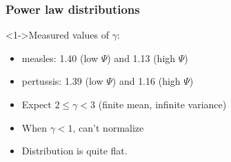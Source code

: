 \begin{frame}
  \frametitle{Power law distributions}

  \begin{block}<1->{Measured values of $\gamma$:}
    \begin{itemize}
    \item <2->{measles: \alert{1.40} (low $\Psi$) and \alert{1.13} (high $\Psi$)}
    \item <3->{pertussis: \alert{1.39} (low $\Psi$) and \alert{1.16} (high $\Psi$)}
    \end{itemize}
  \end{block}

  \begin{itemize}
  \item<4-> Expect $2 \le \gamma < 3$ (finite mean, infinite variance)
  \item<5-> When $\gamma < 1$, can't normalize 
  \item<6-> Distribution is quite \alert{flat}.
  \end{itemize}

\end{frame}




